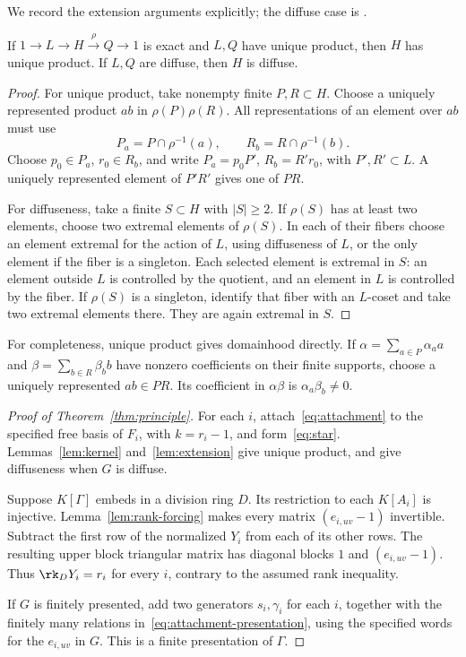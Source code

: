 We record the extension arguments explicitly; the diffuse case is
\cite[Theorem~1.2(1)]{Bowditch}.

\begin{lemma}\label{lem:extension}
If \(1\to L\to H\overset{\rho}{\to}Q\to1\) is exact and \(L,Q\)
have unique product, then \(H\) has unique product. If \(L,Q\) are
diffuse, then \(H\) is diffuse.
\end{lemma}

\begin{proof}
For unique product, take nonempty finite \(P,R\subset H\). Choose
a uniquely represented product \(ab\) in \(\rho(P)\rho(R)\).
All representations of an element over \(ab\) must use
\[
 P_a=P\cap\rho^{-1}(a),\qquad R_b=R\cap\rho^{-1}(b).
\]
Choose \(p_0\in P_a\), \(r_0\in R_b\), and write
\(P_a=p_0P'\), \(R_b=R'r_0\), with \(P',R'\subset L\).
A uniquely represented element of \(P'R'\) gives one of \(PR\).

For diffuseness, take a finite \(S\subset H\) with \(|S|\ge2\).
If \(\rho(S)\) has at least two elements, choose two extremal elements
of \(\rho(S)\). In each of their fibers choose an element extremal for
the action of \(L\), using diffuseness of \(L\), or the only element
if the fiber is a singleton. Each selected element is extremal in
\(S\): an element outside \(L\) is controlled by the quotient, and an
element in \(L\) is controlled by the fiber.
If \(\rho(S)\) is a singleton, identify that fiber with an \(L\)-coset
and take two extremal elements there. They are again extremal in \(S\).
\end{proof}

For completeness, unique product gives domainhood directly. If
\(\alpha=\sum_{a\in P}\alpha_a a\) and
\(\beta=\sum_{b\in R}\beta_b b\) have nonzero coefficients on their
finite supports, choose a uniquely represented \(ab\in PR\).
Its coefficient in \(\alpha\beta\) is
\(\alpha_a\beta_b\ne0\).

\begin{proof}[Proof of Theorem~\ref{thm:principle}]
For each \(i\), attach~\eqref{eq:attachment} to the specified free
basis of \(F_i\), with \(k=r_i-1\), and form~\eqref{eq:star}.
Lemmas~\ref{lem:kernel} and~\ref{lem:extension} give unique product,
and give diffuseness when \(G\) is diffuse.

Suppose \(K[\Gamma]\) embeds in a division ring \(D\). Its restriction
to each \(K[A_i]\) is injective.
Lemma~\ref{lem:rank-forcing} makes every matrix
\((e_{i,uv}-1)\) invertible. Subtract the first row of the normalized
\(Y_i\) from each of its other rows. The resulting upper block
triangular matrix has diagonal blocks \(1\) and
\((e_{i,uv}-1)\). Thus \(\rk_D Y_i=r_i\) for every \(i\), contrary to
the assumed rank inequality.

If \(G\) is finitely presented, add two generators \(s_i,\gamma_i\)
for each \(i\), together with the finitely many relations
in~\eqref{eq:attachment-presentation}, using the specified words for
the \(e_{i,uv}\) in \(G\). This is a finite presentation of \(\Gamma\).
\end{proof}
